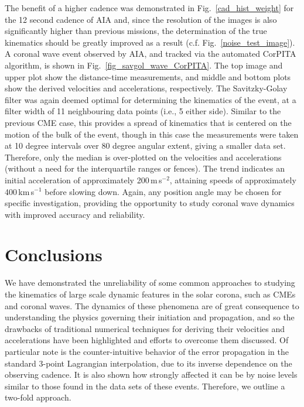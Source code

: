 \documentclass[structabstract]{aa}
\begin{document}
The benefit of a higher cadence was demonstrated in Fig.~\ref{cad_hist_weight} for the 12 second cadence of AIA and, since the resolution of the images is also significantly higher than previous missions, the determination of the true kinematics should be greatly improved as a result (c.f. Fig.~\ref{noise_test_image}). A coronal wave event observed by AIA, and tracked via the automated CorPITA algorithm, is shown in Fig.~\ref{fig_savgol_wave_CorPITA}. The top image and upper plot show the distance-time measurements, and middle and bottom plots show the derived velocities and accelerations, respectively. The Savitzky-Golay filter was again deemed optimal for determining the kinematics of the event, at a filter width of 11 neighbouring data points (i.e., 5 either side). Similar to the previous CME case, this provides a spread of kinematics that is centered on the motion of the bulk of the event, though in this case the measurements were taken at 10 degree intervals over 80 degree angular extent, giving a smaller data set. Therefore, only the median is over-plotted on the velocities and accelerations (without a need for the interquartile ranges or fences). The trend indicates an initial acceleration of approximately 200\,m\,s$^{-2}$, attaining speeds of approximately 400\,km\,s$^{-1}$ before slowing down. Again, any position angle may be chosen for specific investigation, providing the opportunity to study coronal wave dynamics with improved accuracy and reliability.


\section{Conclusions}
\label{sect:conclusions}

We have demonstrated the unreliability of some common approaches to studying the kinematics of large scale dynamic features in the solar corona, such as CMEs and coronal waves. The dynamics of these phenomena are of great consequence to understanding the physics governing their initiation and propagation, and so the drawbacks of traditional numerical techniques for deriving their velocities and accelerations have been highlighted and efforts to overcome them discussed. Of particular note is the counter-intuitive behavior of the error propagation in the standard 3-point Lagrangian interpolation, due to its inverse dependence on the observing cadence. It is also shown how strongly affected it can be by noise levels similar to those found in the data sets of these events. Therefore, we outline a two-fold approach.
\end{document}
